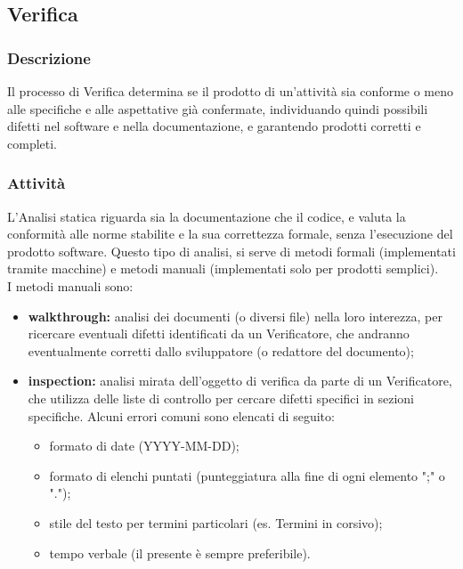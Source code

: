   \subsection{Verifica}
    \subsubsection{Descrizione}
      Il processo di Verifica determina se il prodotto di un'attività sia conforme o meno alle specifiche e alle aspettative già confermate, individuando quindi possibili difetti nel software e nella documentazione, e garantendo prodotti corretti e completi.

    \subsubsection{Attività}
          L'Analisi statica riguarda sia la documentazione che il codice, e valuta la conformità alle norme stabilite e la sua correttezza formale, senza l'esecuzione del prodotto software. Questo tipo di analisi, si serve di metodi formali (implementati tramite macchine) e metodi manuali (implementati solo per prodotti semplici).\\ I metodi manuali sono:
          \begin{itemize}
            \item \textbf{walkthrough:} analisi dei documenti (o diversi file) nella loro interezza, per ricercare eventuali difetti identificati da un Verificatore, che andranno eventualmente corretti dallo sviluppatore (o redattore del documento);
            \item \textbf{inspection:} analisi mirata dell'oggetto di verifica da parte di un Verificatore, che utilizza delle liste di controllo per cercare difetti specifici in sezioni specifiche. Alcuni errori comuni sono elencati di seguito:
              \begin{itemize}
                \item formato di date (YYYY-MM-DD);
                \item formato di elenchi puntati (punteggiatura alla fine di ogni elemento ";" o ".");
                \item stile del testo per termini particolari (es. Termini in corsivo);
                \item tempo verbale (il presente è sempre preferibile).
              \end{itemize}
          \end{itemize}

